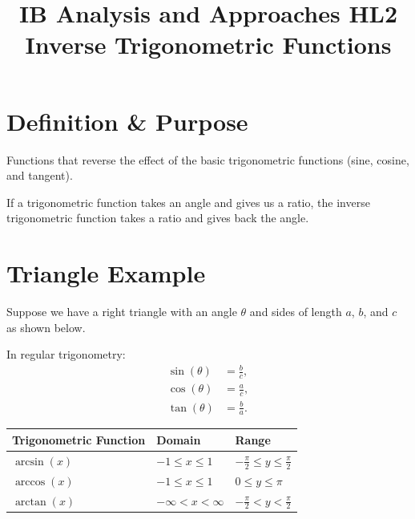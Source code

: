 \documentclass{article}
\title{\textbf{IB Analysis and Approaches HL2 \\ Inverse Trigonometric Functions}}
\author{}
\date{}
\begin{document}
\maketitle

\section*{Definition \& Purpose}
Functions that reverse the effect of the basic trigonometric functions (sine, cosine, and tangent).

If a trigonometric function takes an angle and gives us a ratio, the inverse trigonometric function takes a ratio and gives back the angle.

\section*{Triangle Example}
Suppose we have a right triangle with an angle $\theta$ and sides of length $a$, $b$, and $c$ as shown below.

\begin{center}
\end{center}

In regular trigonometry:
\begin{align*}
    \sin(\theta) & = \frac{b}{c}, \\
    \cos(\theta) & = \frac{a}{c}, \\
    \tan(\theta) & = \frac{b}{a}.
\end{align*}

\begin{center}
    \begin{tabular}{|p{}|p{}|p{}|}
        \hline
        \rowcolor{tableheadercolor}
        \textbf{Trigonometric Function} & \textbf{Domain}        & \textbf{Range}                             \\
        \hline
        $\arcsin(x)$                    & $-1 \leq x \leq 1$     & $-\frac{\pi}{2} \leq y \leq \frac{\pi}{2}$ \\
        \hline
        $\arccos(x)$                    & $-1 \leq x \leq 1$     & $0 \leq y \leq \pi$                        \\
        \hline
        $\arctan(x)$                    & $-\infty < x < \infty$ & $-\frac{\pi}{2} < y < \frac{\pi}{2}$       \\
        \hline
    \end{tabular}
\end{center}
\end{document}
